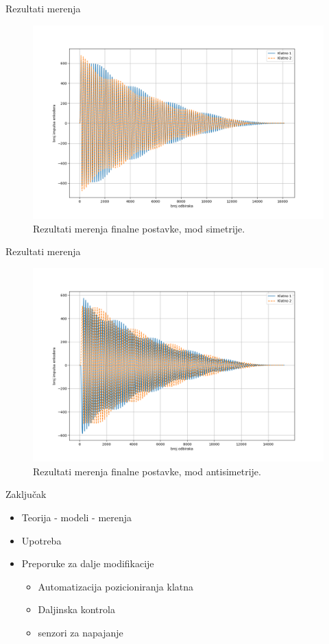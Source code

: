 \documentclass[aspectratio=169,xcolor=dvipsnames]{beamer}
\begin{document}
\begin{frame}{Rezultati merenja}
    \begin{figure}
    \includegraphics[width=0.65\linewidth]{master_fig/klatno_sim.png}
    \caption{Rezultati merenja finalne postavke, mod simetrije.}
    \end{figure}
\end{frame}


\begin{frame}{Rezultati merenja}
    \begin{figure}
    \includegraphics[width=0.65\linewidth]{master_fig/klatno_antisim.png}
    \caption{Rezultati merenja finalne postavke, mod antisimetrije.}
    \end{figure}
\end{frame}



\begin{frame}{Zaključak}

	\begin{itemize}
		\item Teorija - modeli - merenja
		\item Upotreba
		\item Preporuke za dalje modifikacije
			\begin{itemize}
				\item Automatizacija pozicioniranja klatna
				\item Daljinska kontrola
				\item senzori za napajanje
			\end{itemize}
		
	\end{itemize}
    
\end{frame}
\end{document}
